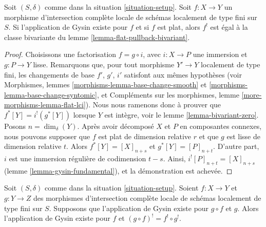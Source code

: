 \begin{lemma}
\label{lemma-lci-gysin-flat}
Soit $(S, \delta)$ comme dans la situation \ref{situation-setup}.
Soit $f : X \to Y$ un morphisme d'intersection complète locale
de schémas localement de type fini sur $S$. Si l'application de Gysin
existe pour $f$ et si $f$ est plat, alors $f^!$ est égal à la
classe bivariante du lemme \ref{lemma-flat-pullback-bivariant}.
\end{lemma}

\begin{proof}
Choisissons une factorisation $f = g \circ i$, avec $i : X \to P$
une immersion et $g : P \to Y$ lisse. Remarquons que, pour
tout morphisme $Y' \to Y$ localement de type fini,
les changements de base $f'$, $g'$, $i'$ satisfont aux mêmes
hypothèses (voir Morphismes, lemmes \ref{morphisms-lemma-base-change-smooth}
et \ref{morphisms-lemma-base-change-syntomic}, et
Compléments sur les morphismes, lemme \ref{more-morphisms-lemma-flat-lci}).
Nous nous ramenons donc à prouver que $f^*[Y] = i^!(g^*[Y])$ lorsque $Y$
est intègre, voir le lemme \ref{lemma-bivariant-zero}. Posons $n = \dim_\delta(Y)$.
Après avoir décomposé $X$ et $P$ en composantes connexes, nous
pouvons supposer que $f$ est plat de dimension relative $r$ et
que $g$ est lisse de dimension relative $t$.
Alors $f^*[Y] = [X]_{n + s}$ et $g^*[Y] = [P]_{n + t}$.
D'autre part, $i$ est une immersion régulière de codimension $t - s$.
Ainsi, $i^![P]_{n + t} = [X]_{n + s}$ (lemme \ref{lemma-gysin-fundamental}),
et la démonstration est achevée.
\end{proof}

\begin{lemma}
\label{lemma-lci-gysin-composition}
Soit $(S, \delta)$ comme dans la situation \ref{situation-setup}.
Soient $f : X \to Y$ et $g : Y \to Z$ des morphismes d'intersection complète locale
de schémas localement de type fini sur $S$. Supposons que l'application de Gysin
existe pour $g \circ f$ et $g$. Alors l'application de Gysin existe pour $f$
et $(g \circ f)^! = f^! \circ g^!$.
\end{lemma}

